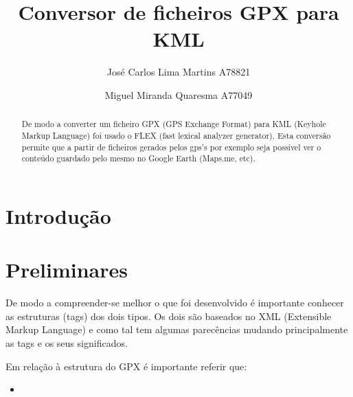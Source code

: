 \documentclass{llncs}
\begin{document}
 \mainmatter
\title{Conversor de ficheiros GPX para KML}
\author{José Carlos Lima Martins A78821 \and
        Miguel Miranda Quaresma A77049}

\maketitle

\justify

\begin{abstract}
De modo a converter um ficheiro GPX (GPS Exchange Format) para KML (Keyhole Markup Language) foi usado o FLEX (fast lexical analyzer generator). Esta conversão permite que a partir de ficheiros gerados pelos gps's por exemplo seja possível ver o conteúdo guardado pelo mesmo no Google Earth (Maps.me, etc).
\end{abstract}

\section{Introdução}

\section{Preliminares}
De modo a compreender-se melhor o que foi desenvolvido é importante conhecer as estruturas (tags) dos dois tipos. Os dois são baseados no XML (Extensible Markup Language) e como tal tem algumas parecências mudando principalmente as tags e os seus significados.

Em relação à estrutura do GPX é importante referir que:
\begin{itemize}
    \item
\end{itemize}
\end{document}
